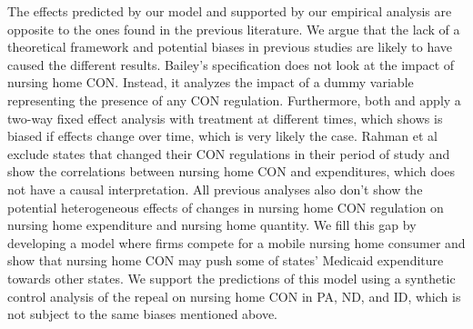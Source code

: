 \documentclass[../Main.tex]{subfiles}
\begin{document}
\indent The effects predicted by our model and supported by our empirical analysis are opposite to the ones found in the previous literature. We argue that the lack of a theoretical framework and potential biases in previous studies are likely to have caused the different results. Bailey’s specification does not look at the impact of nursing home CON. Instead, it analyzes the impact of a dummy variable representing the presence of any CON regulation. Furthermore, both \citet{grabowski2003effects} and \citet{bailey2019can} apply a two-way fixed effect analysis with treatment at different times, which \citet{goodman2021difference} shows is biased if effects change over time, which is very likely the case. Rahman et al \citet{rahman2016impact} exclude states that changed their CON regulations in their period of study and show the correlations between nursing home CON and expenditures, which does not have a causal interpretation. All previous analyses also don’t show the potential heterogeneous effects of changes in nursing home CON regulation on nursing home expenditure and nursing home quantity. We fill this gap by developing a model where firms compete for a mobile nursing home consumer and show that nursing home CON may push some of states’ Medicaid expenditure towards other states. We support the predictions of this model using a synthetic control analysis of the repeal on nursing home CON in PA, ND, and ID, which is not subject to the same biases mentioned above.  
\end{document}
